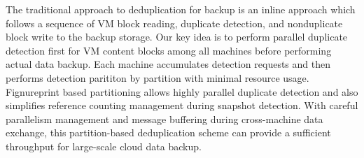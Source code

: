 The traditional approach to  deduplication for backup is an inline approach which follows
a sequence of VM block reading, duplicate detection,  and nonduplicate  block write to the 
backup storage.  
Our key idea  is to  perform parallel duplicate detection first for VM content blocks 
among all machines before performing actual data backup. Each machine
accumulates detection requests and  then performs detection   parititon by partition 
with minimal resource usage.
Fignureprint based partitioning allows highly parallel duplicate detection  and also simplifies 
reference counting management  during snapshot detection.
With careful parallelism management and message buffering during cross-machine data exchange,
this partition-based  deduplication scheme can provide  a sufficient 
throughput for large-scale cloud data  backup.   











